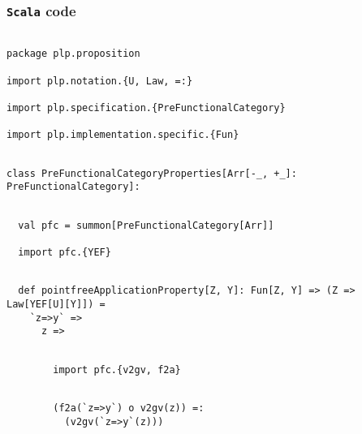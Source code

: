 \documentclass[11pt]{article}
\newcommand{\code}{\subsubsection{{\tt Scala} code}\begingroup\rm \vspace{12pt}}
\begin{document}
\code
\begin{mdframed}[backgroundcolor=lightgray!20] 
\begin{lstlisting}

package plp.proposition

import plp.notation.{U, Law, =:}

import plp.specification.{PreFunctionalCategory}

import plp.implementation.specific.{Fun}
\end{lstlisting}
\end{mdframed}
\vspace{6pt}
\begin{mdframed}[backgroundcolor=lightgray!20] 
\begin{lstlisting}

class PreFunctionalCategoryProperties[Arr[-_, +_]: PreFunctionalCategory]:
\end{lstlisting}
\end{mdframed}    
\vspace{6pt}
\begin{mdframed}[backgroundcolor=lightgray!20] 
\begin{lstlisting}

  val pfc = summon[PreFunctionalCategory[Arr]]

  import pfc.{YEF}
\end{lstlisting}
\end{mdframed}    
\vspace{6pt}
\begin{mdframed}[backgroundcolor=lightgray!20] 
\begin{lstlisting}
  
  def pointfreeApplicationProperty[Z, Y]: Fun[Z, Y] => (Z => Law[YEF[U][Y]]) =
    `z=>y` =>
      z =>
\end{lstlisting}
\end{mdframed}
\vspace{6pt}
\begin{mdframed}[backgroundcolor=lightgray!20] 
\begin{lstlisting}

        import pfc.{v2gv, f2a}
\end{lstlisting}
\end{mdframed}
\vspace{6pt}
\begin{mdframed}[backgroundcolor=lightgray!20] 
\begin{lstlisting}

        (f2a(`z=>y`) o v2gv(z)) =:
          (v2gv(`z=>y`(z)))
\end{lstlisting}
\end{mdframed}    
\end{document}
